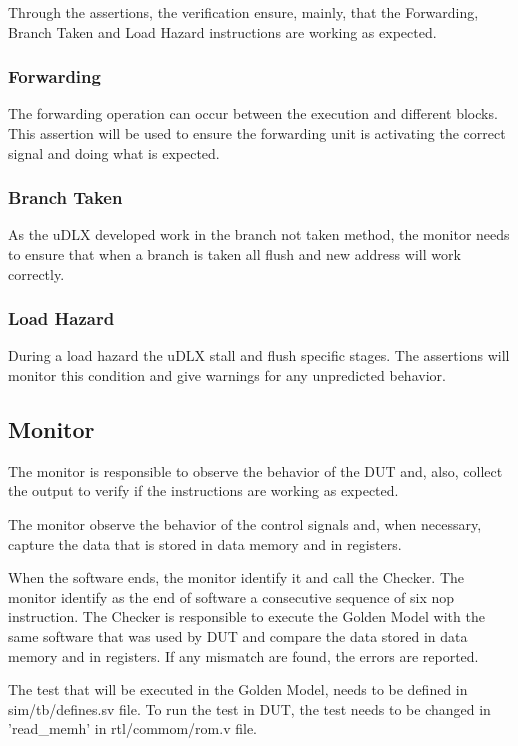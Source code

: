 \documentclass{article}
\begin{document}
Through the assertions, the verification ensure, mainly, that the Forwarding, Branch Taken and Load Hazard instructions are working as expected.

	\subsubsection{Forwarding}
	
	The forwarding operation can occur between the execution and different blocks. This assertion will be used to ensure the forwarding unit is activating the correct signal and doing what is expected.
	
	\subsubsection{Branch Taken}
	
	As the uDLX developed work in the branch not taken method, the monitor needs to ensure that when a branch is taken all flush and new address will work correctly.
	
	\subsubsection{Load Hazard}

	During a load hazard the uDLX stall and flush specific stages. The assertions will monitor this condition and give warnings for any unpredicted behavior.	
	
	\subsection{Monitor}
	
	The monitor is responsible to observe the behavior of the DUT and, also, collect the output to verify if the instructions are working as expected.
	
	The monitor observe the behavior of the control signals and, when necessary, capture the data that is stored in data memory and in registers.
	
	When the software ends, the monitor identify it and call the Checker. The monitor identify as the end of software a consecutive sequence of six nop instruction.
The Checker is responsible to execute the Golden Model with the same software that was used by DUT and compare the data stored in data memory and in registers. If any mismatch are found, the errors are reported.

	The test that will be executed in the Golden Model, needs to be defined in sim\//tb/defines.sv file. To run the test in DUT, the test needs to be changed in 'read\_memh' in rtl\//commom/rom.v file.
\end{document}
